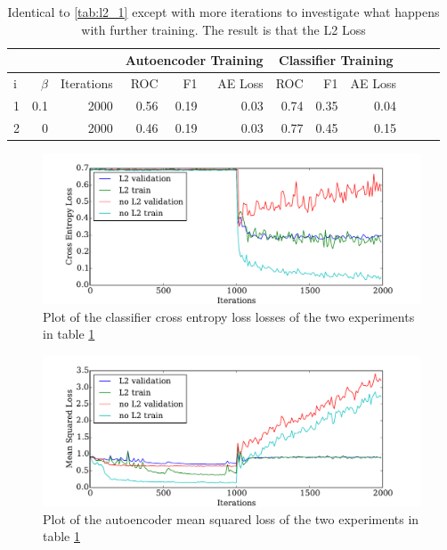     \begin{table}[!h] {\footnotesize \centering
      \begin{tabular}{lrrrrrrrrrrr}
        &&&   \multicolumn{3}{|c|}{Autoencoder Training} &  \multicolumn{3}{c|}{Classifier Training}    \\
      \hline
       i &   $\beta$ &   Iterations &   ROC&F1&AE Loss & ROC & F1 & AE Loss \\
      \hline
       1 &       0.1 & 2000 &    0.56 &   0.19 &     0.03 &    0.74 &   0.35 &     0.04\\
       2 &       0   & 2000 &    0.46 &   0.19 &     0.03 &    0.77 &   0.45 &     0.15\\
      \hline
    \end{tabular}
    \caption{Identical to \ref{tab:l2_1} except with more iterations to investigate what happens with further training. The result is that
    the L2 Loss }
    \label{tab:l2_2} }
    \end{table}

    \begin{figure}[!h]
    \centering
    \includegraphics[width =0.8\hsize]{figures/l2.pdf}
    \caption{Plot of the classifier cross entropy loss losses of the two experiments in table \ref{tab:l2_2} }
    \label{fig:l2_1}
    \end{figure}

    \begin{figure}[!h]
    \centering
    \includegraphics[width =0.8\hsize]{figures/l2_auto.pdf}
    \caption{Plot of the autoencoder mean squared loss of the two experiments in table \ref{tab:l2_2} }
    \label{fig:l2_2}
    \end{figure}

